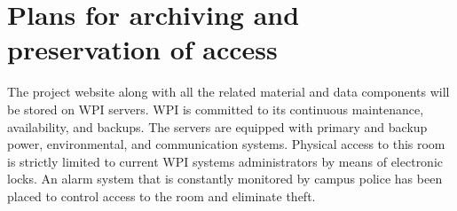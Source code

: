 \section{Plans for archiving and preservation of access}\label{sec:axiv}
The project website along with all the related material and data components will be stored on WPI servers. WPI is committed to its continuous maintenance, availability, and backups. The servers are equipped with primary and backup power, environmental, and communication systems. Physical access to this room is strictly limited to current WPI systems administrators by means of electronic locks. An alarm system that is constantly monitored by campus police has been placed to control access to the room and eliminate theft.